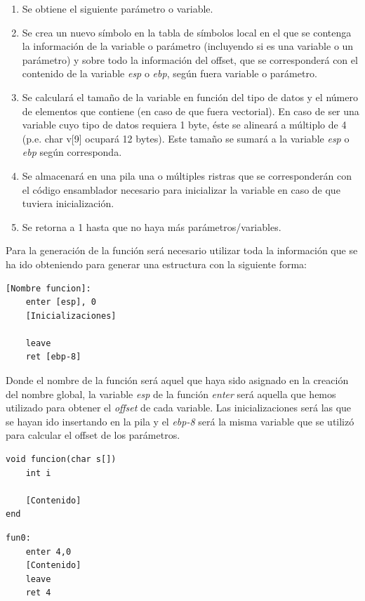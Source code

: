 \documentclass[a4paper,10pt]{article}
\begin{document}
\begin{enumerate}
\item Se obtiene el siguiente parámetro o variable.
\item Se crea un nuevo símbolo en la tabla de símbolos local en el que se contenga la información de la variable o parámetro (incluyendo si es una variable o un parámetro) y sobre todo la información del offset, que se corresponderá con el contenido de la variable \textit{esp} o \textit{ebp}, según fuera variable o parámetro.
\item Se calculará el tamaño de la variable en función del tipo de datos y el número de elementos que contiene (en caso de que fuera vectorial). En caso de ser una variable cuyo tipo de datos requiera 1 byte, éste se alineará a múltiplo de 4 (p.e. char v[9] ocupará 12 bytes). Este tamaño se sumará a la variable \textit{esp} o \textit{ebp} según corresponda.
\item Se almacenará en una pila una o múltiples ristras que se corresponderán con el código ensamblador necesario para inicializar la variable en caso de que tuviera inicialización.
\item Se retorna a 1 hasta que no haya más parámetros/variables.
\end{enumerate}

Para la generación de la función será necesario utilizar toda la información que se ha ido obteniendo para generar una estructura con la siguiente forma:

\begin{lstlisting}
[Nombre funcion]:
	enter [esp], 0
	[Inicializaciones]
	
	leave
	ret [ebp-8]
\end{lstlisting}

Donde el nombre de la función será aquel que haya sido asignado en la creación del nombre global, la variable \textit{esp} de la función \textit{enter} será aquella que hemos utilizado para obtener el \textit{offset} de cada variable. Las inicializaciones será las que se hayan ido insertando en la pila y el \textit{ebp-8} será la misma variable que se utilizó para calcular el offset de los parámetros.
\begin{multicols}{2}
\begin{lstlisting}[language=jam,frame=single]
void funcion(char s[])
	int i
	
	[Contenido]
end
\end{lstlisting}
\begin{lstlisting}[frame=single]
fun0:
	enter 4,0
	[Contenido]
	leave
	ret 4
\end{lstlisting}
\end{multicols}
\end{document}
